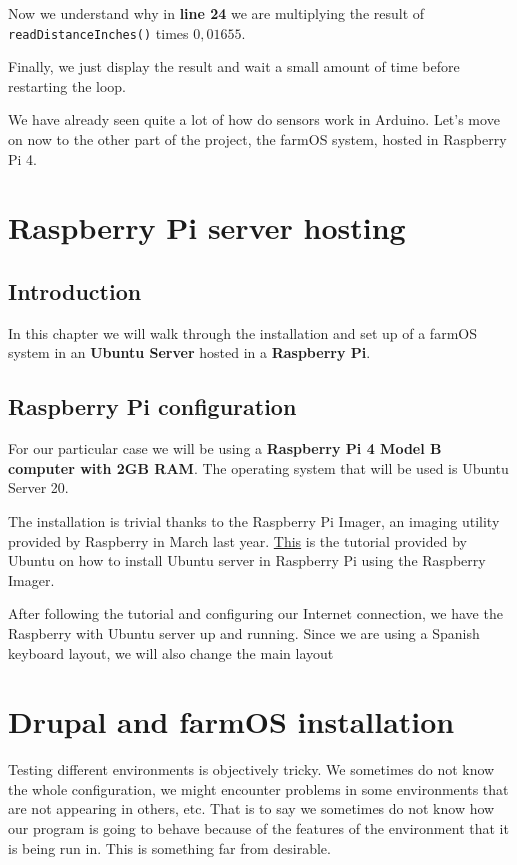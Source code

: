 Now we understand why in \textbf{line 24} we are multiplying the result of \verb|readDistanceInches()| times \(0,01655\).

Finally, we just display the result and wait a small amount of time before restarting the loop.

\vspace{7mm}
We have already seen quite a lot of how do sensors work in Arduino. Let's move on now to the other part of the project, the farmOS system, hosted in Raspberry Pi 4.

\newpage
\section{Raspberry Pi server hosting}

\subsection{Introduction}
In this chapter we will walk through the installation and set up of a farmOS system in an \textbf{Ubuntu Server} hosted in a \textbf{Raspberry Pi}.

\subsection{Raspberry Pi configuration}
For our particular case we will be using a \textbf{Raspberry Pi 4 Model B computer with 2GB RAM}. The operating system that will be used is Ubuntu Server 20.

The installation is trivial thanks to the Raspberry Pi Imager, an imaging utility provided by Raspberry in March last year. \href{https://ubuntu.com/tutorials/how-to-install-ubuntu-on-your-raspberry-pi#1-overview}{This} is the tutorial provided by Ubuntu on how to install Ubuntu server in Raspberry Pi using the Raspberry Imager.

After following the tutorial and configuring our Internet connection, we have the Raspberry with Ubuntu server up and running. Since we are using a Spanish keyboard layout, we will also change the main layout
\section{Drupal and farmOS installation}

Testing different environments is objectively tricky. We sometimes do not know the whole configuration, we might encounter problems in some environments that are not appearing in others, etc. That is to say we sometimes do not know how our program is going to behave because of the features of the environment that it is being run in. This is something far from desirable.

